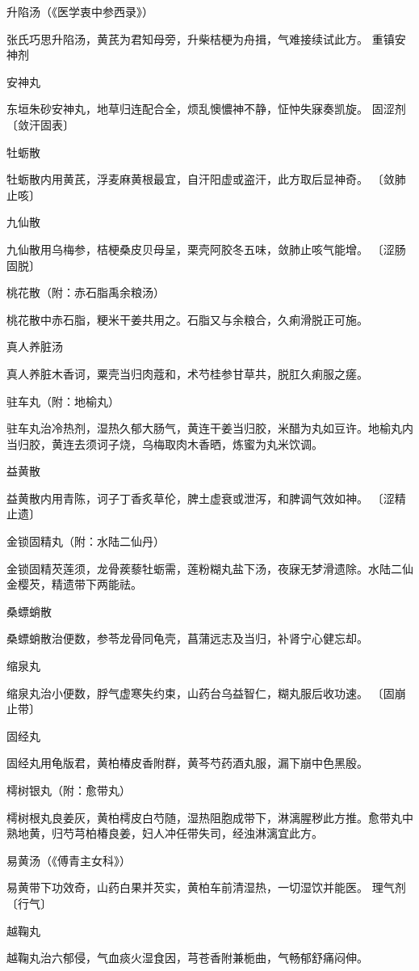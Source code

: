 \documentclass[a4paper,12pt,UTF8,twoside]{ctexbook}
\begin{document}
升陷汤（《医学衷中参西录》）

张氏巧思升陷汤，黄芪为君知母旁，升柴桔梗为舟揖，气难接续试此方。
重镇安神剂

安神丸

东垣朱砂安神丸，地草归连配合全，烦乱懊憹神不静，怔忡失寐奏凯旋。
固涩剂
〔敛汗固表〕

牡蛎散

牡蛎散内用黄芪，浮麦麻黄根最宜，自汗阳虚或盗汗，此方取后显神奇。
〔敛肺止咳〕

九仙散

九仙散用乌梅参，桔梗桑皮贝母呈，栗壳阿胶冬五味，敛肺止咳气能增。
〔涩肠固脱〕

桃花散（附：赤石脂禹余粮汤）

桃花散中赤石脂，粳米干姜共用之。石脂又与余粮合，久痢滑脱正可施。

真人养脏汤

真人养脏木香诃，粟壳当归肉蔻和，术芍桂参甘草共，脱肛久痢服之瘥。

驻车丸（附：地榆丸）

驻车丸治冷热剂，湿热久郁大肠气，黄连干姜当归胶，米醋为丸如豆许。地榆丸内当归胶，黄连去须诃子烧，乌梅取肉木香晒，炼蜜为丸米饮调。

益黄散

益黄散内用青陈，诃子丁香炙草伦，脾土虚衰或泄泻，和脾调气效如神。
〔涩精止遗〕

金锁固精丸（附：水陆二仙丹）

金锁固精芡莲须，龙骨蒺藜牡蛎需，莲粉糊丸盐下汤，夜寐无梦滑遗除。水陆二仙金樱芡，精遗带下两能祛。

桑螵蛸散

桑螵蛸散治便数，参苓龙骨同龟壳，菖蒲远志及当归，补肾宁心健忘却。

缩泉丸

缩泉丸治小便数，脬气虚寒失约束，山药台乌益智仁，糊丸服后收功速。
〔固崩止带〕

固经丸

固经丸用龟版君，黄柏椿皮香附群，黄芩芍药酒丸服，漏下崩中色黑殷。

樗树银丸（附：愈带丸）

樗树根丸良姜灰，黄柏樗皮白芍随，湿热阻胞成带下，淋漓腥秽此方推。愈带丸中熟地黄，归芍芎柏椿良姜，妇人冲任带失司，经浊淋漓宜此方。

易黄汤（《傅青主女科》）

易黄带下功效奇，山药白果并芡实，黄柏车前清湿热，一切湿饮并能医。
理气剂
〔行气〕

越鞠丸

越鞠丸治六郁侵，气血痰火湿食因，芎苍香附兼栀曲，气畅郁舒痛闷伸。
\end{document}
